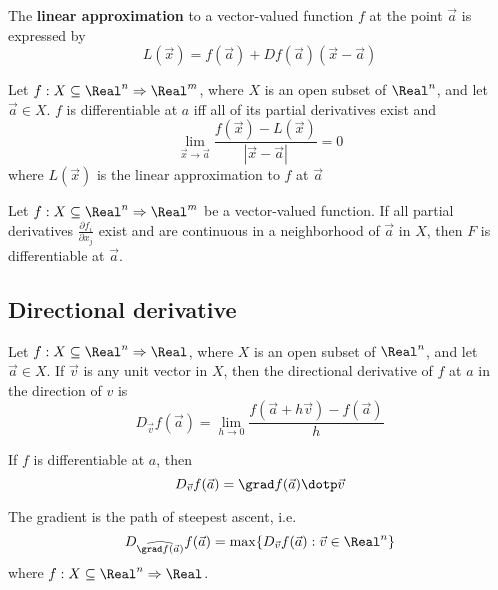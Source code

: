 \begin{definition}
  The \textbf{linear approximation} to a vector-valued function $f$ at the point $\vec{a}$ is expressed by
  \[
    L(\vec{x}) = f(\vec{a}) + Df(\vec{a})(\vec{x} - \vec{a})
  \]
\end{definition}

\begin{definition}[Differentiability]
  Let $f : X \subseteq \Real^n \Rightarrow \Real^m$, where $X$ is an open subset of $\Real^n$, and let $\vec{a} \in X$. $f$ is differentiable at $a$ iff all of its partial derivatives exist and 
  \[
    \lim_{\vec{x} \to \vec{a}} \frac{f(\vec{x}) - L(\vec{x})}{|\vec{x} - \vec{a}|} = 0
  \]
  where $L(\vec{x})$ is the linear approximation to $f$ at $\vec{a}$
\end{definition}

\begin{theorem}
  Let $f : X \subseteq \Real^n \Rightarrow \Real^m$ be a vector-valued function. If all partial derivatives $\frac{\partial f_i}{\partial x_j}$ exist and are continuous in a neighborhood of $\vec{a}$ in $X$, then $F$ is differentiable at $\vec{a}$.
\end{theorem}

\subsection{Directional derivative}


\begin{definition}
  Let $f : X \subseteq \Real^n \Rightarrow \Real$, where $X$ is an open subset of $\Real^n$, and let $\vec{a} \in X$. If $\vec{v}$ is any unit vector in $X$, then the directional derivative of $f$ at $a$ in the direction of $v$ is
  \[
    D_{\vec{v}} f(\vec{a}) = \lim_{h \to 0} \frac{f(\vec{a} + h\vec{v}) - f(\vec{a})}{h}
  \]
\end{definition}

\begin{theorem}
  If $f$ is differentiable at $a$, then
  \[
    D_{\vec{v}} f(\vec{a}) = \grad f(\vec{a}) \dotp \vec{v}
  \]
\end{theorem}

\begin{theorem}
  The gradient is the path of steepest ascent, i.e.
  \[
    D_{\widehat{\grad f(\vec{a})}} f(\vec{a}) = \max \{ D_{\vec{v}} f(\vec{a}) : \vec{v} \in \Real^n \}
  \]
  where $f : X \subseteq \Real^n \Rightarrow \Real$.
\end{theorem}

